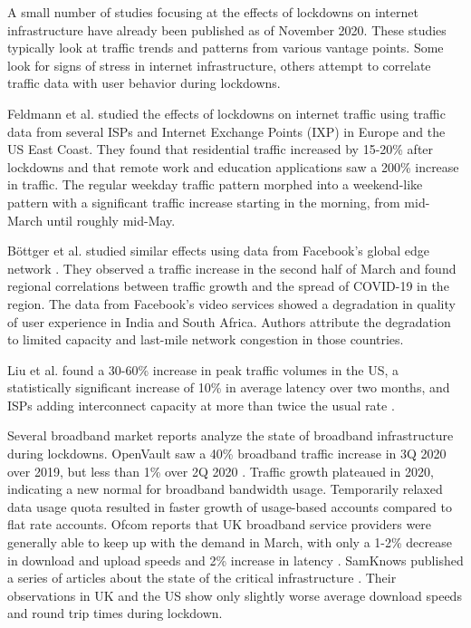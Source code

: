 \documentclass[conference,10pt]{IEEEtran}
\begin{document}
A small number of studies focusing at the effects of lockdowns on internet infrastructure have already been published as of November 2020. These studies typically look at traffic trends and patterns from various vantage points. Some look for signs of stress in internet infrastructure, others attempt to correlate traffic data with user behavior during lockdowns.

Feldmann et al. studied the effects of lockdowns on internet traffic using traffic data from several ISPs and Internet Exchange Points (IXP) in Europe and the US East Coast\cite{feldmann2020lockdown}. They found that residential traffic increased by 15-20\% after lockdowns and that remote work and education applications saw a 200\% increase in traffic. The regular weekday traffic pattern morphed into a weekend-like pattern with a significant traffic increase starting in the morning, from mid-March until roughly mid-May.

B\"{o}ttger et al. studied similar effects using data from Facebook's global edge network \cite{bottger2020internet}. They observed a traffic increase in the second half of March and found regional correlations between traffic growth and the spread of COVID-19 in the region. The data from Facebook's video services showed a degradation in quality of user experience in India and South Africa. Authors attribute the degradation to limited capacity and last-mile network congestion in those countries.

Liu et al. found a 30-60\% increase in peak traffic volumes in the US, a statistically significant increase of 10\% in average latency over two months, and ISPs adding interconnect capacity at more than twice the usual rate \cite{liu2020characterizing}.

\nocite{lutu2020characterization}

Several broadband market reports analyze the state of broadband infrastructure during lockdowns. OpenVault saw a 40\% broadband traffic increase in 3Q 2020 over 2019, but less than 1\% over 2Q 2020 \cite{openvault}. Traffic growth plateaued in 2020, indicating a new normal for broadband bandwidth usage. Temporarily relaxed data usage quota resulted in faster growth of usage-based accounts compared to flat rate accounts. Ofcom reports that UK broadband service providers were generally able to keep up with the demand in March, with only a 1-2\% decrease in download and upload speeds and 2\% increase in latency \cite{uk-home-broadband-performance}. SamKnows published a series of articles about the state of the critical infrastructure \cite{samknows-cdn,samknows-video-streaming,samknows-video-conferencing,samknows-usa}. Their observations in UK and the US show only slightly worse average download speeds and round trip times during lockdown.
\end{document}
